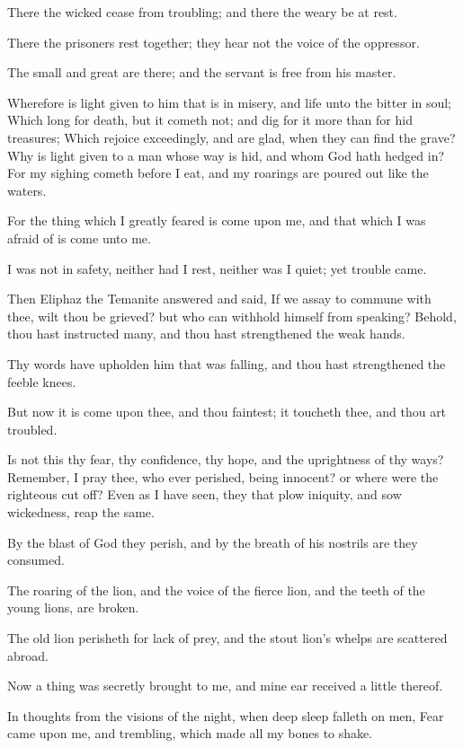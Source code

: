 \Verse There the wicked cease from troubling; and there the weary be at rest.

\Verse There the prisoners rest together; they hear not the voice of the oppressor.

\Verse The small and great are there; and the servant is free from his master.

\Verse Wherefore is light given to him that is in misery, and life unto the bitter in soul; \Verse Which long for death, but it cometh not; and dig for it more than for hid treasures; \Verse Which rejoice exceedingly, and are glad, when they can find the grave?  \Verse Why is light given to a man whose way is hid, and whom God hath hedged in?  \Verse For my sighing cometh before I eat, and my roarings are poured out like the waters.

\Verse For the thing which I greatly feared is come upon me, and that which I was afraid of is come unto me.

\Verse I was not in safety, neither had I rest, neither was I quiet; yet trouble came.


\Chapter
\Verse Then Eliphaz the Temanite answered and said, \Verse If we assay to commune with thee, wilt thou be grieved? but who can withhold himself from speaking?  \Verse Behold, thou hast instructed many, and thou hast strengthened the weak hands.

\Verse Thy words have upholden him that was falling, and thou hast strengthened the feeble knees.

\Verse But now it is come upon thee, and thou faintest; it toucheth thee, and thou art troubled.

\Verse Is not this thy fear, thy confidence, thy hope, and the uprightness of thy ways?  \Verse Remember, I pray thee, who ever perished, being innocent? or where were the righteous cut off?  \Verse Even as I have seen, they that plow iniquity, and sow wickedness, reap the same.

\Verse By the blast of God they perish, and by the breath of his nostrils are they consumed.

\Verse The roaring of the lion, and the voice of the fierce lion, and the teeth of the young lions, are broken.

\Verse The old lion perisheth for lack of prey, and the stout lion's whelps are scattered abroad.

\Verse Now a thing was secretly brought to me, and mine ear received a little thereof.

\Verse In thoughts from the visions of the night, when deep sleep falleth on men, \Verse Fear came upon me, and trembling, which made all my bones to shake.

